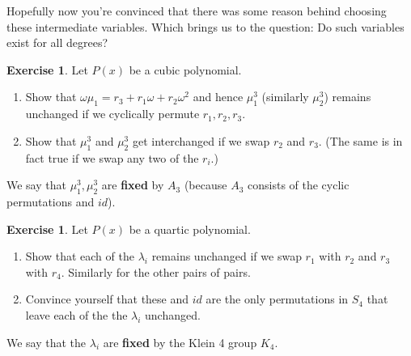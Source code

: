 \documentclass[reqno, 12pt, letter]{article}
\theoremstyle{plain}
\theoremstyle{definition}
\newtheorem{remark}[theorem]{Remark}
\newtheorem{exercise}[theorem]{Exercise}
\theoremstyle{remark}
\numberwithin{equation}{section}
\begin{document}
	Hopefully now you're convinced that there was some reason behind choosing these intermediate variables. Which brings us to the question: Do such variables exist for all degrees? 
		\begin{exercise} 
			Let $ P(x)$ be a cubic polynomial. 
			\begin{enumerate}
				\item Show that $ \omega \mu_1 = r_3 + r_1 \omega + r_2 \omega^2$ and hence $ \mu_1^3$ (similarly $ \mu_2^3$) remains unchanged if we cyclically permute $ r_1, r_2, r_3$.
				\item Show that $ \mu_1^3$ and $ \mu_2^3$ get interchanged if we swap $ r_2$ and $ r_3$. (The same is in fact true if we swap any two of the $ r_i$.)
			\end{enumerate}
			We say that $ \mu_1^3, \mu_2^3$ are \textbf{fixed} by $ A_3$ (because $ A_3$ consists of the cyclic permutations and $ id$).
		\end{exercise}
		
		\begin{exercise}
			Let $ P(x)$ be a quartic polynomial. 
			\begin{enumerate}
				\item Show that each of the $ \lambda_i$ remains unchanged if we swap $ r_1$ with $r_2$ and $ r_3$ with $ r_4$. Similarly for the other pairs of pairs.
				\item Convince yourself that these and $ id$ are the only permutations in $ S_4$ that leave each of the the $ \lambda_i$ unchanged.
			\end{enumerate}
			We say that the $ \lambda_i$ are \textbf{fixed} by the Klein 4 group $K_4$.
		\end{exercise}
			
\end{document}
